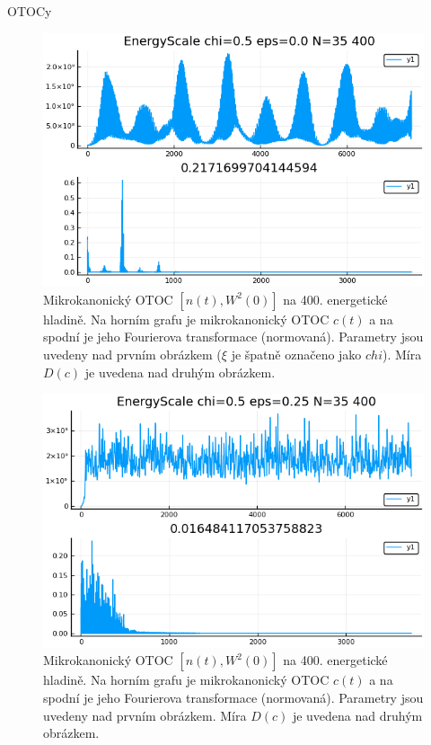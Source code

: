\documentclass{article}
\begin{document}
\begin{section}{OTOCy}
    \begin{figure}[H]
        \begin{center}
            \includegraphics[width=12cm]{E_0.png}
        \end{center}
        
        \caption{Mikrokanonický OTOC $[n(t),W^2(0)]$ na 400. energetické hladině. Na horním grafu je mikrokanonický OTOC $c(t)$
         a na spodní je jeho Fourierova transformace (normovaná). Parametry jsou uvedeny nad prvním obrázkem ($\xi$ je špatně označeno jako 
         $chi$). Míra 
        $D(c)$ je uvedena nad druhým obrázkem.}
    \end{figure}

    \begin{figure}[H]
        \begin{center}
            \includegraphics[width=12cm]{E_0.25.png}
        \end{center}
        
        \caption{Mikrokanonický OTOC $[n(t),W^2(0)]$ na 400. energetické hladině. Na horním grafu je mikrokanonický OTOC $c(t)$
        a na spodní je jeho Fourierova transformace (normovaná). Parametry jsou uvedeny nad prvním obrázkem. Míra 
        $D(c)$ je uvedena nad druhým obrázkem.}
    \end{figure}


\end{section}
\end{document}
